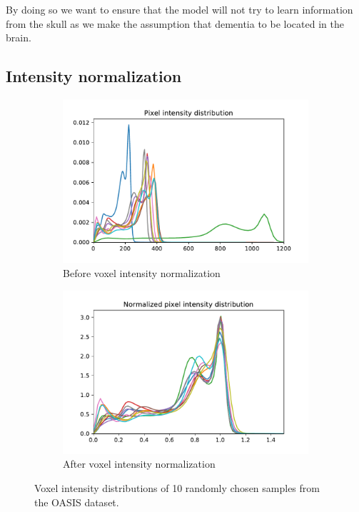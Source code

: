 By doing so we want to ensure that the model will not try to learn information from the skull as we make the assumption that dementia to be located in the brain.

\subsection{Intensity normalization}

\begin{figure}
\centering
\begin{subfigure}{.5\textwidth}
  \centering
  \includegraphics[width=1\linewidth]{figures/preprocessing/intensity_before_norm.pdf}
  \caption{Before voxel intensity normalization}
  \label{fig:before_intensity_normalization}
\end{subfigure}%
\begin{subfigure}{.5\textwidth}
  \centering
  \includegraphics[width=1\linewidth]{figures/preprocessing/intensity_after_norm.pdf}
  \caption{After voxel intensity normalization}
  \label{fig:after_intensity_normalization}
\end{subfigure}
\caption{Voxel intensity distributions of 10 randomly chosen samples from the OASIS dataset.}
\label{fig:intensity_normalization}
\end{figure}

